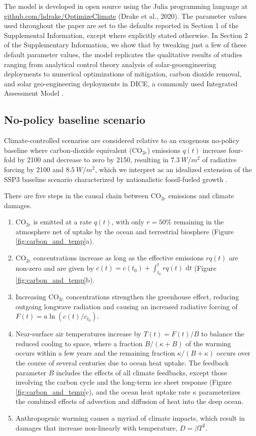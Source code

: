 \documentclass[9pt,twocolumn,twoside,lineno]{pnas-new}
\begin{document}
The model is developed in open source using the Julia programming language \cite{bezanson_julia:_2017} at \url{github.com/hdrake/OptimizeClimate} (Drake et al., 2020). The parameter values used throughout the paper are set to the defaults reported in Section 1 of the Supplemental Information, except where explicitly stated otherwise. In Section 2 of the Supplementary Information, we show that by tweaking just a few of these default parameter values, the model replicates the qualitative results of studies ranging from analytical control theory analysis of solar-geoengineering deployments \cite{soldatenko_optimal_2018} to numerical optimizations of mitigation, carbon dioxide removal, and solar geo-engineering deployments in DICE, a commonly used Integrated Assessment Model \cite{belaia_optimal_2019}.

\subsection*{No-policy baseline scenario}
Climate-controlled scenarios are considered relative to an exogenous no-policy baseline where carbon-dioxide equivalent (CO$_{2e}$) emissions $q(t)$ increase four-fold by 2100 and decrease to zero by 2150, resulting in $\SI{7.3}{W/m^{2}}$ of radiative forcing by 2100 and $\SI{8.5}{W/m^{2}}$, which we interpret as an idealized extension of the SSP3 baseline scenario characterized by nationalistic fossil-fueled growth \cite[][and Section A of Supplemental Information]{riahi_shared_2017}.

There are five steps in the causal chain between CO$_{2e}$ emissions and climate damages.
\begin{enumerate}
    \item CO$_{2e}$ is emitted at a rate $q(t)$, with only $r = 50\%$ remaining in the atmosphere net of uptake by the ocean and terrestrial biosphere (Figure \ref{fig:carbon_and_temp}a).
    \item CO$_{2e}$ concentrations increase as long as the effective emissions $rq(t)$ are non-zero and are given by $c(t) = c(t_{0}) + \int_{t_{0}}^{t} rq(t)\text{ d}t$ (Figure \ref{fig:carbon_and_temp}b).
    \item Increasing CO$_{2e}$ concentrations strengthen the greenhouse effect, reducing outgoing longwave radiation and causing an increased radiative forcing of $F(t) = a \ln(c(t)/c_{t_{0}})$. 
    \item Near-surface air temperatures increase by $T(t) = F(t)/B$ to balance the reduced cooling to space, where a fraction $B/(\kappa + B)$ of the warming occurs within a few years and the remaining fraction $\kappa/(B + \kappa)$ occurs over the course of several centuries due to ocean heat uptake. The feedback parameter $B$ includes the effects of all climate feedbacks, except those involving the carbon cycle and the long-term ice sheet response (Figure \ref{fig:carbon_and_temp}c), and the ocean heat uptake rate $\kappa$ parameterizes the combined effects of advection and diffusion of heat into the deep ocean.
    \item Anthropogenic warming causes a myriad of climate impacts, which result in damages that increase non-linearly with temperature, $D = \beta T^{2}$.
\end{enumerate} 
\end{document}
